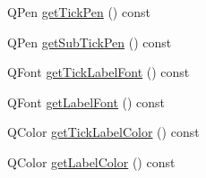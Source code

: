 \begin{DoxyCompactItemize}
\item 
Q\+Pen \hyperlink{class_q_c_p_axis_a7f503910be40fb1717e1635be3ef17e1}{get\+Tick\+Pen} () const 
\item 
Q\+Pen \hyperlink{class_q_c_p_axis_ab4f7e60a40eb051c775afcaeab895c85}{get\+Sub\+Tick\+Pen} () const 
\item 
Q\+Font \hyperlink{class_q_c_p_axis_aef30b66668986523225089a67280ec7a}{get\+Tick\+Label\+Font} () const 
\item 
Q\+Font \hyperlink{class_q_c_p_axis_ab0768eb2879efb202645d19ff789e63e}{get\+Label\+Font} () const 
\item 
Q\+Color \hyperlink{class_q_c_p_axis_a0f8583f7ac24ccc70d39fdd2389cad6e}{get\+Tick\+Label\+Color} () const 
\item 
Q\+Color \hyperlink{class_q_c_p_axis_a42bd69b9e9c571f13624079be18ccdc1}{get\+Label\+Color} () const 
\end{DoxyCompactItemize}
